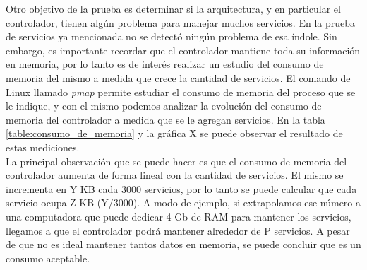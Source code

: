 Otro objetivo de la prueba es determinar si la arquitectura, y en particular el controlador, tienen algún problema para manejar muchos servicios. En la prueba de servicios ya mencionada no se detectó ningún problema de esa índole. Sin embargo, es importante recordar que el controlador mantiene toda su información en memoria, por lo tanto es de interés realizar un estudio del consumo de memoria del mismo a medida que crece la cantidad de servicios. El comando de Linux llamado \textit{pmap} permite estudiar el consumo de memoria del proceso que se le indique, y con el mismo podemos analizar la evolución del consumo de memoria del controlador a medida que se le agregan servicios. En la tabla \ref{table:consumo_de_memoria} y la gráfica X se puede observar el resultado de estas mediciones. \\
La principal observación que se puede hacer es que el consumo de memoria del controlador aumenta de forma lineal con la cantidad de servicios. El mismo se incrementa en Y KB cada 3000 servicios, por lo tanto se puede calcular que cada servicio ocupa Z KB (Y/3000). A modo de ejemplo, si extrapolamos ese número a una computadora que puede dedicar 4 Gb de RAM para mantener los servicios, llegamos a que el controlador podrá mantener alrededor de P servicios. A pesar de que no es ideal mantener tantos datos en memoria, se puede concluir que es un consumo aceptable. \\


